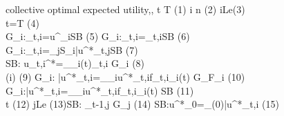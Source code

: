 \begin{figure}
\begin{center}
\begin{pseudocode}[ruled]{collective optimal expected utility}{,,\Gr}
\label{algo31}
\FOR t \GETS T  \hspace{9.08cm}(1)  \DO \BEGIN
\FOR i \GETS n  \hspace{7.85cm}(2)\DO \BEGIN
\IF i\in Le\hspace{8.63cm}(3)\\ \BEGIN  \IF t=T \hspace{8.43cm}(4)\\
\BEGIN G_i:_{t,i}=u^{\Gr}_i\longrightarrow SB \hspace{5.92cm}(5) \END
\ELSE G_i:_{t,i}=_{t,i}\longrightarrow SB \hspace{4.91cm}(6)
\END
\ELSE G_i:_{t,i}=\sum_{j\in S_i}\bar{u}^*_{t,j}\longrightarrow SB \hspace{4.09cm}(7) \\
 SB: u_{t,i}^*=\max_{_i(t)}_{t,i} \longrightarrow G_i \hspace{4.87cm}(8)\\
\IF (i) \hspace{8.53cm}(9)  \THEN \BEGIN G_i: \bar{u}^*_{t,i}=\int_{_i}u^*_{t,i}f_{t,i}\dr {}_i(t) \longrightarrow G_{F_i}  \hspace{2.41cm}(10)\END
\ELSE \BEGIN G_i:\bar{u}^*_{t,i}=\int_{_i}u^*_{t,i}f_{t,i}\dr {}_i(t) \longrightarrow SB \hspace{2.55cm}(11)\\
\IF t \hspace{7.12cm}(12) \THEN \BEGIN \FOREACH j\in Le \hspace{3.935cm}(13)\DO \BEGIN  SB: _{t-1,j} \longrightarrow G_j \hspace{2.37cm}(14)\END \END
\ELSE SB:u^*_0=\max_{(0)}\bar{u}^*_{t,i}  \hspace{3.47cm}(15)
\END
\END \END 
\end{pseudocode}
\end{center}
\end{figure}

